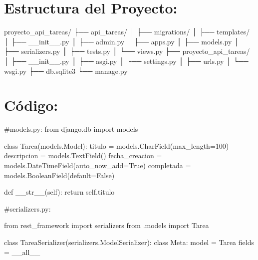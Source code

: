 \documentclass[
  a4paper,
  DIV=11,
  numbers=noendperiod,
  onepage,
  openany]{scrreprt}
\newenvironment{Shaded}{\begin{snugshade}}{\end{snugshade}}
\newcommand{\CommentTok}[1]{\textcolor[rgb]{0.37,0.37,0.37}{#1}}
\newcommand{\ControlFlowTok}[1]{\textcolor[rgb]{0.00,0.23,0.31}{#1}}
\newcommand{\DecValTok}[1]{\textcolor[rgb]{0.68,0.00,0.00}{#1}}
\newcommand{\FunctionTok}[1]{\textcolor[rgb]{0.28,0.35,0.67}{#1}}
\newcommand{\ImportTok}[1]{\textcolor[rgb]{0.00,0.46,0.62}{#1}}
\newcommand{\KeywordTok}[1]{\textcolor[rgb]{0.00,0.23,0.31}{#1}}
\newcommand{\NormalTok}[1]{\textcolor[rgb]{0.00,0.23,0.31}{#1}}
\newcommand{\OperatorTok}[1]{\textcolor[rgb]{0.37,0.37,0.37}{#1}}
\newcommand{\StringTok}[1]{\textcolor[rgb]{0.13,0.47,0.30}{#1}}
\newcommand{\VariableTok}[1]{\textcolor[rgb]{0.07,0.07,0.07}{#1}}
\begin{document}
\hypertarget{estructura-del-proyecto}{%
\section{Estructura del Proyecto:}\label{estructura-del-proyecto}}

\begin{Shaded}
\begin{Highlighting}[]
\NormalTok{proyecto\_api\_tareas/}
\NormalTok{├── api\_tareas/}
\NormalTok{│   ├── migrations/}
\NormalTok{│   ├── templates/}
\NormalTok{│   ├── \_\_init\_\_.py}
\NormalTok{│   ├── admin.py}
\NormalTok{│   ├── apps.py}
\NormalTok{│   ├── models.py}
\NormalTok{│   ├── serializers.py}
\NormalTok{│   ├── tests.py}
\NormalTok{│   └── views.py}
\NormalTok{├── proyecto\_api\_tareas/}
\NormalTok{│   ├── \_\_init\_\_.py}
\NormalTok{│   ├── asgi.py}
\NormalTok{│   ├── settings.py}
\NormalTok{│   ├── urls.py}
\NormalTok{│   └── wsgi.py}
\NormalTok{├── db.sqlite3}
\NormalTok{└── manage.py}
\end{Highlighting}
\end{Shaded}

\hypertarget{cuxf3digo}{%
\section{Código:}\label{cuxf3digo}}

\begin{Shaded}
\begin{Highlighting}[]
\CommentTok{\#models.py:}
\ImportTok{from}\NormalTok{ django.db }\ImportTok{import}\NormalTok{ models}

\KeywordTok{class}\NormalTok{ Tarea(models.Model):}
\NormalTok{    titulo }\OperatorTok{=}\NormalTok{ models.CharField(max\_length}\OperatorTok{=}\DecValTok{100}\NormalTok{)}
\NormalTok{    descripcion }\OperatorTok{=}\NormalTok{ models.TextField()}
\NormalTok{    fecha\_creacion }\OperatorTok{=}\NormalTok{ models.DateTimeField(auto\_now\_add}\OperatorTok{=}\VariableTok{True}\NormalTok{)}
\NormalTok{    completada }\OperatorTok{=}\NormalTok{ models.BooleanField(default}\OperatorTok{=}\VariableTok{False}\NormalTok{)}

    \KeywordTok{def} \FunctionTok{\_\_str\_\_}\NormalTok{(}\VariableTok{self}\NormalTok{):}
        \ControlFlowTok{return} \VariableTok{self}\NormalTok{.titulo}
\end{Highlighting}
\end{Shaded}

\begin{Shaded}
\begin{Highlighting}[]
\CommentTok{\#serializers.py:}

\ImportTok{from}\NormalTok{ rest\_framework }\ImportTok{import}\NormalTok{ serializers}
\ImportTok{from}\NormalTok{ .models }\ImportTok{import}\NormalTok{ Tarea}

\KeywordTok{class}\NormalTok{ TareaSerializer(serializers.ModelSerializer):}
    \KeywordTok{class}\NormalTok{ Meta:}
\NormalTok{        model }\OperatorTok{=}\NormalTok{ Tarea}
\NormalTok{        fields }\OperatorTok{=} \StringTok{\textquotesingle{}\_\_all\_\_\textquotesingle{}}
\end{Highlighting}
\end{Shaded}
\end{document}
